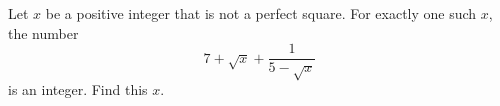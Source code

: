 Let $x$ be a positive integer that is not a perfect square. For exactly one such $x$, the number
\[7+\sqrt x+\dfrac{1}{5-\sqrt x}\]
is an integer. Find this $x$.
